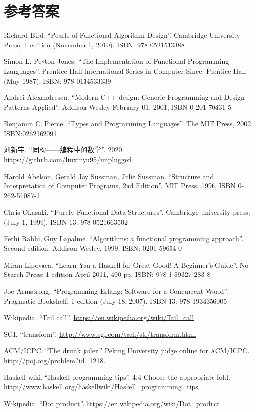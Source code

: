 \documentclass[b5paper]{ctexart}
\begin{document}
\ifx\wholebook\relax \else
\section{参考答案}
\shipoutAnswer

\begin{thebibliography}{99}

Richard Bird. ``Pearls of Functional Algorithm Design''. Cambridge University Press; 1 edition (November 1, 2010). ISBN: 978-0521513388

Simon L. Peyton Jones. ``The Implementation of Functional Programming Languages''. Prentice-Hall International Series in Computer Since. Prentice Hall (May 1987). ISBN: 978-0134533339

Andrei Alexandrescu. ``Modern C++ design: Generic Programming and Design Patterns Applied''. Addison Wesley February 01, 2001, ISBN 0-201-70431-5

Benjamin C. Pierce. ``Types and Programming Languages''. The MIT Press, 2002. ISBN:0262162091

刘新宇. ``同构——编程中的数学''. 2020. \url{https://github.com/liuxinyu95/unplugged}

Harold Abelson, Gerald Jay Sussman, Julie Sussman. ``Structure and Interpretation of Computer Programs, 2nd Edition''. MIT Press, 1996, ISBN 0-262-51087-1

Chris Okasaki. ``Purely Functional Data Structures''. Cambridge university press, (July 1, 1999), ISBN-13: 978-0521663502

Fethi Rabhi, Guy Lapalme. ``Algorithms: a functional programming approach''. Second edition. Addison-Wesley, 1999. ISBN: 0201-59604-0

Miran Lipovaca. ``Learn You a Haskell for Great Good! A Beginner's Guide''. No Starch Press; 1 edition April 2011, 400 pp. ISBN: 978-1-59327-283-8

Joe Armstrong. ``Programming Erlang: Software for a Concurrent World''. Pragmatic Bookshelf; 1 edition (July 18, 2007). ISBN-13: 978-1934356005

Wikipedia. ``Tail call''. \url{https://en.wikipedia.org/wiki/Tail_call}

SGI. ``transform''. \url{http://www.sgi.com/tech/stl/transform.html}

ACM/ICPC. ``The drunk jailer.'' Peking University judge online for ACM/ICPC. \url{http://poj.org/problem?id=1218}.

Haskell wiki. ``Haskell programming tips''. 4.4 Choose the appropriate fold. \url{http://www.haskell.org/haskellwiki/Haskell_programming_tips}

Wikipedia. ``Dot product''. \url{https://en.wikipedia.org/wiki/Dot_product}

\end{thebibliography}

\expandafter\enddocument
\fi
\end{document}

